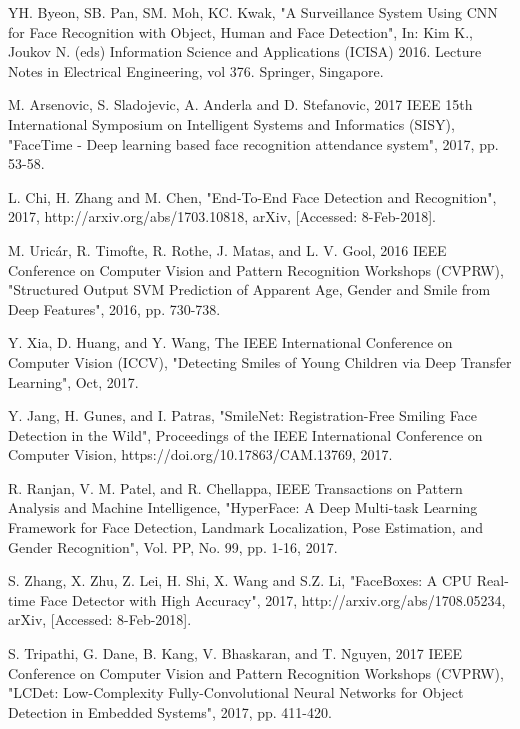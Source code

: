 \documentclass[conference]{IEEEtran}
\begin{document}
\begin{thebibliography}{00}
YH. Byeon, SB. Pan, SM. Moh, KC. Kwak, "A Surveillance System Using CNN for Face Recognition with Object, Human and Face Detection", In: Kim K., Joukov N. (eds) Information Science and Applications (ICISA) 2016. Lecture Notes in Electrical Engineering, vol 376. Springer, Singapore.

M. Arsenovic, S. Sladojevic, A. Anderla and D. Stefanovic, 2017 IEEE 15th International Symposium on Intelligent Systems and Informatics (SISY), "FaceTime - Deep learning based face recognition attendance system", 2017, pp. 53-58.

 L. Chi, H. Zhang and M. Chen, "End-To-End Face Detection and Recognition", 2017, http://arxiv.org/abs/1703.10818, arXiv, [Accessed: 8-Feb-2018].

M. Uricár, R. Timofte, R. Rothe, J. Matas, and L. V. Gool, 2016 IEEE Conference on Computer Vision and Pattern Recognition Workshops (CVPRW), "Structured Output SVM Prediction of Apparent Age, Gender and Smile from Deep Features", 2016, pp. 730-738.

Y. Xia, D. Huang, and Y. Wang, The IEEE International Conference on Computer Vision (ICCV), "Detecting Smiles of Young Children via Deep Transfer Learning", Oct, 2017.

 Y. Jang, H. Gunes, and I. Patras, "SmileNet: Registration-Free Smiling Face Detection in the Wild", Proceedings of the IEEE International Conference on Computer Vision, https://doi.org/10.17863/CAM.13769, 2017.

R. Ranjan, V. M. Patel, and R. Chellappa, IEEE Transactions on Pattern Analysis and Machine Intelligence, "HyperFace: A Deep Multi-task Learning Framework for Face Detection, Landmark Localization, Pose Estimation, and Gender Recognition", Vol. PP, No. 99, pp. 1-16, 2017.


 S. Zhang, X. Zhu, Z. Lei, H. Shi, X. Wang and S.Z. Li, "FaceBoxes: {A} {CPU} Real-time Face Detector with High Accuracy", 2017, http://arxiv.org/abs/1708.05234, arXiv, [Accessed: 8-Feb-2018].

S. Tripathi, G. Dane, B. Kang, V. Bhaskaran, and T. Nguyen, 2017 IEEE Conference on Computer Vision and Pattern Recognition Workshops (CVPRW), "LCDet: Low-Complexity Fully-Convolutional Neural Networks for Object Detection in Embedded Systems", 2017, pp. 411-420.


\end{thebibliography}
\end{document}
